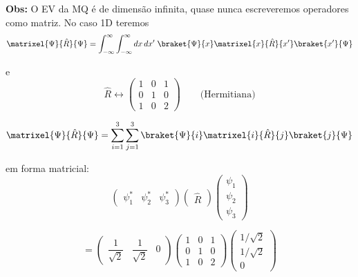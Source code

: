 \noindent \textbf{Obs:} O EV da MQ é de dimensão infinita, quase nunca escreveremos operadores como matriz. No caso 1D teremos
\begin{equation}
    \matrixel{\Psi}{\hat{R}}{\Psi} = \int_{-\infty}^{\infty}\int_{-\infty}^{\infty} dx\, dx' \; \braket{\Psi}{x}\matrixel{x}{\hat{R}}{x'}\braket{x'}{\Psi}
\label{eq:aula12_R_continuo}
\end{equation}

e
\begin{equation}
    \hat{R} \leftrightarrow
    \begin{pmatrix}
        1 & 0 & 1 \\
        0 & 1 & 0 \\
        1 & 0 & 2
    \end{pmatrix}
    \qquad \text{(Hermitiana)}
\label{eq:aula12_matriz_R}
\end{equation}

\begin{equation}
    \matrixel{\Psi}{\hat{R}}{\Psi} = \sum_{i=1}^{3}\sum_{j=1}^{3} \braket{\Psi}{i}\matrixel{i}{\hat{R}}{j}\braket{j}{\Psi}
\label{eq:aula12_R_soma_matricial}
\end{equation}

em forma matricial:
\begin{equation}
    \begin{pmatrix} \psi_1^* & \psi_2^* & \psi_3^* \end{pmatrix}
    \begin{pmatrix} \hat{R} \end{pmatrix}
    \begin{pmatrix} \psi_1 \\ \psi_2 \\ \psi_3 \end{pmatrix}
\label{eq:aula12_R_matricial_geral}
\end{equation}

\begin{equation}
    = \begin{pmatrix} \dfrac{1}{\sqrt{2}} & \dfrac{1}{\sqrt{2}} & 0 \end{pmatrix}
    \begin{pmatrix} 1 & 0 & 1 \\ 0 & 1 & 0 \\ 1 & 0 & 2 \end{pmatrix}
    \begin{pmatrix} 1/\sqrt{2} \\ 1/\sqrt{2} \\ 0 \end{pmatrix}
\label{eq:aula12_R_matricial_exemplo}
\end{equation}

